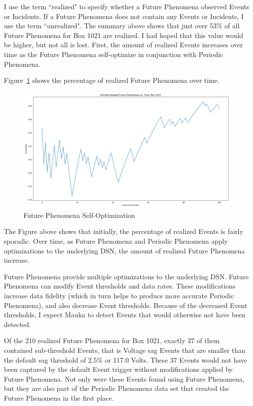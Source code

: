 I use the term ``realized" to specify whether a Future Phenomena observed Events or Incidents. If a Future Phenomena does not contain any Events or Incidents, I use the term ``unrealized". The summary above shows that just over 53\% of all Future Phenomena for Box 1021 are realized. I had hoped that this value would be higher, but not all is lost. First, the amount of realized Events increases over time as the Future Phenomena self-optimize in conjunction with Periodic Phenomena.

Figure~\ref{fig:future_opt} shows the percentage of realized Future Phenomena over time.

\begin{figure}[h]
    \centering
    \includegraphics[width=\linewidth]{figures/future_opt.png}
    \caption{Future Phenomena Self-Optimization}
    \label{fig:future_opt}
\end{figure}

The Figure above shows that initially, the percentage of realized Events is fairly sporadic. Over time, as Future Phenomena and Periodic Phenomena apply optimizations to the underlying DSN, the amount of realized Future Phenomena increase.

Future Phenomena provide multiple optimizations to the underlying DSN. Future Phenomena can modify Event thresholds and data rates. These modifications increase data fidelity (which in turn helps to produce more accurate Periodic Phenomena), and also decrease Event thresholds. Because of the decreased Event thresholds, I expect Mauka to detect Events that would otherwise not have been detected.

Of the 210 realized Future Phenomena for Box 1021, exactly 37 of them contained sub-threshold Events, that is Voltage sag Events that are smaller than the default sag threshold of 2.5\% or 117.0 Volts. These 37 Events would not have been captured by the default Event trigger without modifications applied by Future Phenomena. Not only were these Events found using Future Phenomena, but they are also part of the Periodic Phenomena data set that created the Future Phenomena in the first place.

